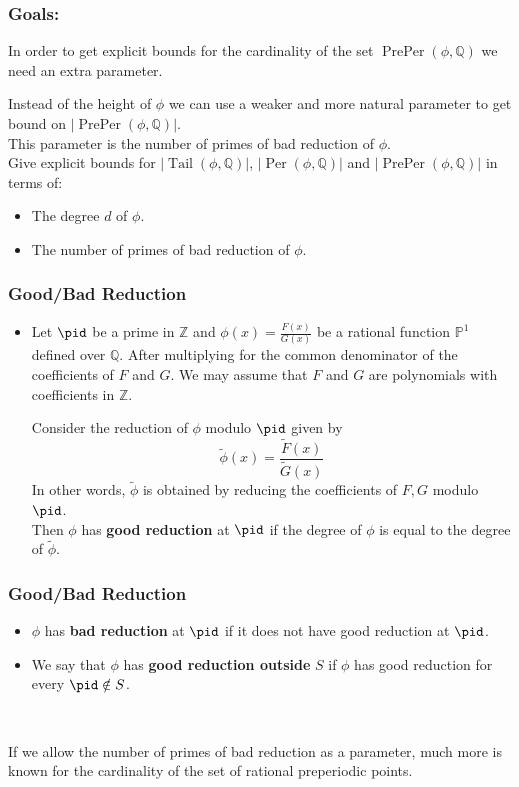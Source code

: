 \documentclass{beamer}
\def\jump{ \quad \\ \vspace{0.7cm} \pause}
\def\PP{{\mathbb P}}
\def\QQ{{\mathbb Q}}
\def\ZZ{{\mathbb Z}}
\DeclareMathOperator{\Tail}{Tail}
\DeclareMathOperator{\Per}{Per}
\DeclareMathOperator{\PrePer}{PrePer}
\theoremstyle{thmstyle}
\theoremstyle{thmstyle}
\theoremstyle{mystyle}
\theoremstyle{qstnstyle}
\begin{document}
\begin{frame}
\frametitle{Goals:}

In order to get explicit bounds for the cardinality of the set $\PrePer(\phi,\QQ)$ we need an extra parameter. 

Instead of the height of $\phi$ we can use a weaker and more natural parameter to get bound on $|\PrePer(\phi,\QQ)|$.\pause 
\jump
This parameter is the number of primes of bad reduction of $\phi$.
\jump
Give explicit bounds for $|\Tail(\phi,\QQ)|$, $|\Per(\phi,\QQ)|$ and $|\PrePer(\phi,\QQ)|$ in terms of:
\begin{itemize}
\item The degree $d$ of $\phi$.

\item The number of primes of bad reduction of $\phi$.
\end{itemize}
\end{frame}

\begin{frame}
\frametitle{Good/Bad Reduction}

\begin{itemize}
\item Let $\pid$ be a prime in $\ZZ$ and $\phi(x)=\frac{F(x)}{G(x)}$ be a rational function $\PP^1$ defined over $\QQ$. \pause  After multiplying for the common denominator of the coefficients of $F$ and $G$. We may assume that $F$ and $G$ are polynomials with coefficients in $\ZZ$.

\pause
Consider the reduction of $\phi$ modulo $\pid$ given by
$$\tilde{\phi}(x)=\frac{\tilde{F}(x)}{\tilde{G}(x)} $$
In other words, $\tilde{\phi}$ is obtained by reducing the coefficients of $F,G$ modulo $\pid$.
\jump
Then $\phi$ has \textbf{good reduction} at $\pid$ if the degree of $\phi$ is equal to the degree of $\tilde{\phi}$.
\end{itemize}
\end{frame}

\begin{frame}
\frametitle{Good/Bad Reduction}
\begin{itemize}
\item $\phi$ has \textbf{bad reduction} at $\pid$ if it does not have good reduction at $\pid$.
\jump
\item We say that $\phi$  has \textbf{good reduction outside} $S$ if $\phi$ has good reduction for every $\pid \notin S$.

\jump
\end{itemize}

If we allow the number of primes of bad reduction as a parameter, much more is known for the cardinality of the set of rational preperiodic points. 
\end{frame}
\end{document}
